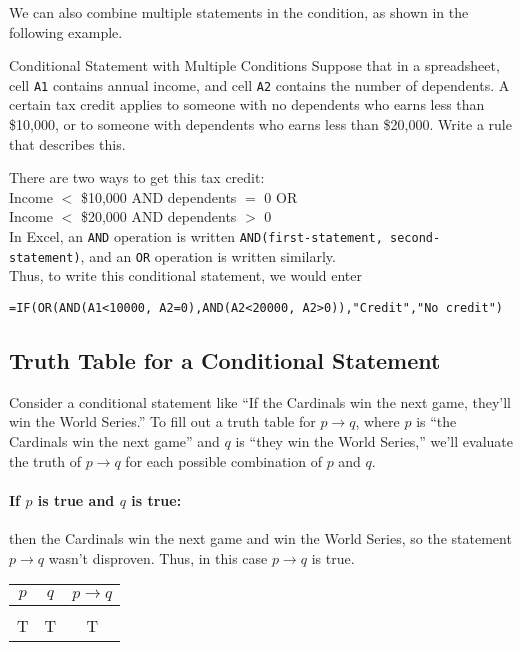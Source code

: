 We can also combine multiple statements in the condition, as shown in the following example.

\begin{example}[https://www.youtube.com/watch?v=36rk4NKhQZc]{Conditional Statement with Multiple Conditions}
Suppose that in a spreadsheet, cell \verb|A1| contains annual income, and cell \verb|A2| contains the number of dependents.  A certain tax credit applies to someone with no dependents who earns less than \$10,000, or to someone with dependents who earns less than \$20,000.  Write a rule that describes this.

\sol
There are two ways to get this tax credit:\\
Income $<$ \$10,000 AND dependents $=$ 0 OR\\
Income $<$ \$20,000 AND dependents $>$ 0\\

In Excel, an \verb|AND| operation is written \verb|AND(first-statement, second-statement)|, and an \verb|OR| operation is written similarly.\\

Thus, to write this conditional statement, we would enter
\begin{center}
\verb|=IF(OR(AND(A1<10000, A2=0),AND(A2<20000, A2>0)),"Credit","No credit")|
\end{center}
\end{example}
\vfill
\pagebreak

\subsection{Truth Table for a Conditional Statement}
Consider a conditional statement like ``If the Cardinals win the next game, they'll win the World Series.''  To fill out a truth table for $p \to q$, where $p$ is ``the Cardinals win the next game'' and $q$ is ``they win the World Series,'' we'll evaluate the truth of $p \to q$ for each possible combination of $p$ and $q$.

\paragraph{If $p$ is true and $q$ is true:} then the Cardinals win the next game and win the World Series, so the statement $p \to q$ wasn't disproven.  Thus, in this case $p \to q$ is true.
\begin{center}
\begin{tabular}{c c c}
$p$ & $q$ & $p \to q$\\
\hline
& & \\
T & T & T
\end{tabular}
\end{center}

